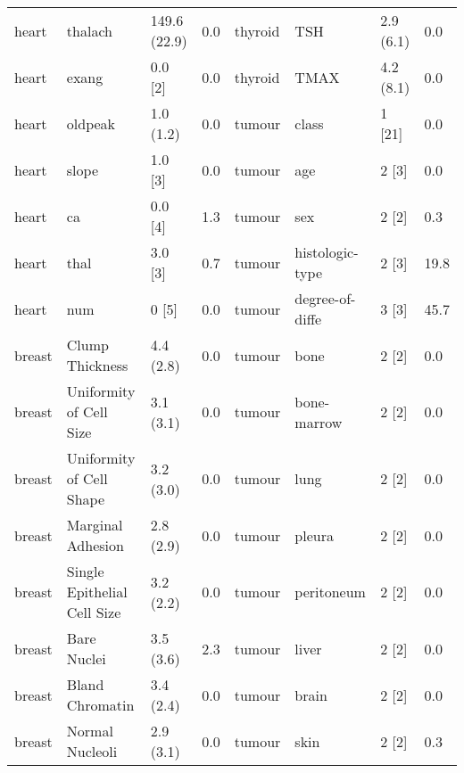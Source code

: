 \begin{small}
\begin{table}[H]
\begin{tabularx}{\textwidth}{lXll|lXll}
                heart   & thalach                        & 149.6 (22.9) & 0.0      & thyroid & TSH             & 2.9 (6.1)    & 0.0      \\
                heart   & exang                          & 0.0 {[}2{]}  & 0.0      & thyroid & TMAX            & 4.2 (8.1)    & 0.0      \\
                heart   & oldpeak                        & 1.0 (1.2)    & 0.0      & tumour   & class           & 1 {[}21{]}   & 0.0      \\
                heart   & slope                          & 1.0 {[}3{]}  & 0.0      & tumour   & age             & 2 {[}3{]}    & 0.0      \\
                heart   & ca                             & 0.0 {[}4{]}  & 1.3      & tumour   & sex             & 2 {[}2{]}    & 0.3      \\
                heart   & thal                           & 3.0 {[}3{]}  & 0.7      & tumour   & histologic-type & 2 {[}3{]}    & 19.8     \\
                heart   & num                            & 0 {[}5{]}    & 0.0      & tumour   & degree-of-diffe & 3 {[}3{]}    & 45.7     \\
                breast  & Clump Thickness               & 4.4 (2.8)    & 0.0      & tumour   & bone            & 2 {[}2{]}    & 0.0      \\
                breast  & Uniformity of Cell Size     & 3.1 (3.1)    & 0.0      & tumour   & bone-marrow     & 2 {[}2{]}    & 0.0      \\
                breast  & Uniformity of Cell Shape    & 3.2 (3.0)    & 0.0      & tumour   & lung            & 2 {[}2{]}    & 0.0      \\
                breast  & Marginal Adhesion             & 2.8 (2.9)    & 0.0      & tumour   & pleura          & 2 {[}2{]}    & 0.0      \\
                breast  & Single Epithelial Cell Size & 3.2 (2.2)    & 0.0      & tumour   & peritoneum      & 2 {[}2{]}    & 0.0      \\
                breast  & Bare Nuclei                   & 3.5 (3.6)    & 2.3      & tumour   & liver           & 2 {[}2{]}    & 0.0      \\
                breast  & Bland Chromatin               & 3.4 (2.4)    & 0.0      & tumour   & brain           & 2 {[}2{]}    & 0.0      \\
                breast  & Normal Nucleoli               & 2.9 (3.1)    & 0.0      & tumour   & skin            & 2 {[}2{]}    & 0.3      \\

\end{tabularx}
\end{table}
\end{small}
